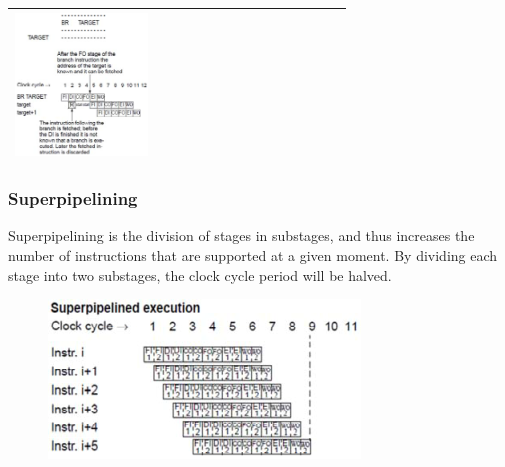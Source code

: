 \begin{longtable}{|>{\bfseries}p{}|p{}|p{}|}
						\includegraphics[width=0.45\textwidth]{./pictures/controlHazard.png}\\
				\hline
			\end{longtable}
		
		\begin{minipage}[t][7cm]{0.475\textwidth}
			\subsubsection{Superpipelining}
			Superpipelining is the division of stages in substages, and thus increases the number of instructions that are supported at a given moment. By dividing each stage into two substages, the clock cycle period will be halved.
			\vfill
			\begin{figure}[H]\centering
				\includegraphics[width=\textwidth]{./pictures/superpipelined.png}
			\end{figure}
		\end{minipage}
		\hfill
